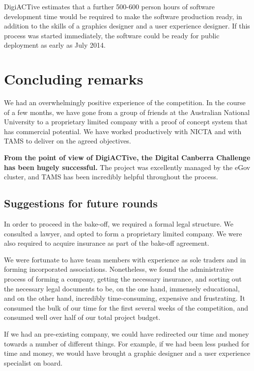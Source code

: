 \documentclass[12pt,a4paper,twosided]{article}
\begin{document}
DigiACTive estimates that a further 500-600 person hours of software
development time would be required to make the software production
ready, in addition to the skills of a graphics designer and a user
experience designer. If this process was started immediately, the
software could be ready for public deployment as early as July 2014.


\newpage
\section{Concluding remarks}

We had an overwhelmingly positive experience of the competition. In the
course of a few months, we have gone from a group of friends at the
Australian National University to a proprietary limited company with a
proof of concept system that has commercial potential. We have worked
productively with NICTA and with TAMS to deliver on the agreed
objectives.

\textbf{From the point of view of DigiACTive, the Digital Canberra
Challenge has been hugely successful.} The project was excellently
managed by the eGov cluster, and TAMS has been incredibly helpful
throughout the process.

\subsection{Suggestions for future rounds}

In order to proceed in the bake-off, we required a formal legal
structure. We consulted a lawyer, and opted to form a proprietary
limited company. We were also required to acquire insurance as part of
the bake-off agreement.

We were fortunate to have team members with experience as sole traders
and in forming incorporated associations. Nonetheless, we found the
administrative process of forming a company, getting the necessary
insurance, and sorting out the necessary legal documents to be, on the
one hand, immensely educational, and on the other hand, incredibly
time-consuming, expensive and frustrating. It consumed the bulk of our
time for the first several weeks of the competition, and consumed well
over half of our total project budget.

If we had an pre-existing company, we could have redirected our time and
money towards a number of different things. For example, if we had been
less pushed for time and money, we would have brought a graphic designer
and a user experience specialist on board.
\end{document}
